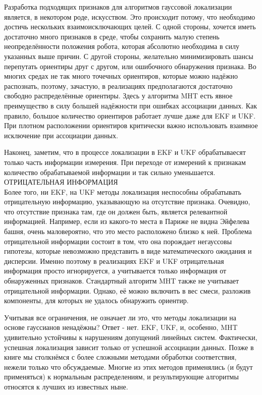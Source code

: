 \documentclass[10pt,a4paper]{article}
\begin{document}
Разработка подходящих признаков для алгоритмов гауссовой локализации является, в некотором роде, искусством. Это происходит потому, что необходимо достичь нескольких взаимоисключающих целей. 
С одной стороны, хочется иметь достаточно много признаков в среде, чтобы сохранить малую степень неопределённости положения робота, которая абсолютно необходима в силу указанных выше причин. С другой стороны, желательно минимизировать шансы перепутать ориентиры друг с другом, или  ошибочного обнаружения признака. Во многих средах не так много точечных ориентиров, которые можно надёжно распознать, поэтому, зачастую, в реализациях предполагаются достаточно свободно распределённые ориентиры. Здесь у алгоритма MHT есть явное преимущество в силу большей надёжности при ошибках ассоциации данных. Как правило, большое количество ориентиров работает лучше даже для EKF и UKF. При плотном расположении ориентиров критически важно использовать взаимное исключение при ассоциации данных. 

Наконец, заметим, что в процессе локализации в EKF и UKF обрабатываесят только часть информации измерения. При переходе от измерений к признакам количество обрабатываемой информации и так сильно уменьшается.\\
ОТРИЦАТЕЛЬНАЯ ИНФОРМАЦИЯ\\ Более того, ни EKF, на UKF методы локализация неспособны обрабатывать отрицательную информацию, указывающую на отсутствие признака. Очевидно, что отсутствие признака там, где он должен быть, является релевантной информацией. Например, если из какого-то места в Париже не видна Эйфелева башня, очень маловероятно, что это место расположено близко к ней. Проблема отрицательной информации состоит в том, что она порождает негауссовы гипотезы, которые невозможно представить в виде математического ожидания и дисперсии. Именно поэтому в реализациях EKF и UKF отрицательная информация просто игнорируется, а учитывается только информация от обнаруженных признаков. Стандартный алгоритм MHT также не учитывает отрицательной информации. Однако, её можно включить в вес смеси, разложив компоненты, для которых не удалось обнаружить ориентир.

Учитывая все ограничения, не означает ли это, что методы локализации на основе гауссианов ненадёжны? Ответ - нет. EKF,  UKF, и, особенно, MHT удивительно устойчивы к нарушениям допущений линейных систем. Фактически, успешная локализация зависит только от успешной ассоциации данных. Позже в книге мы столкнёмся с более сложными методами обработки соответствия, нежели только что обсуждаемые. 
Многие из этих методов применялись (и будут применяться) к нормальным распределениям, и результирующие алгоритмы относятся к лучших из известных ныне.\\
\end{document}
